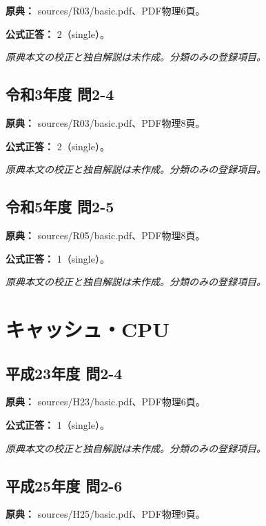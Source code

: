 \noindent\textbf{原典：} sources/R03/basic.pdf、PDF物理6頁。

\textbf{公式正答：} 2（single）。

\par\textit{原典本文の校正と独自解説は未作成。分類のみの登録項目。}

\subsection{令和3年度 問2-4}
\label{q:r03-reg-basic-2-4}

\noindent\textbf{原典：} sources/R03/basic.pdf、PDF物理8頁。

\textbf{公式正答：} 2（single）。

\par\textit{原典本文の校正と独自解説は未作成。分類のみの登録項目。}

\subsection{令和5年度 問2-5}
\label{q:r05-reg-basic-2-5}

\noindent\textbf{原典：} sources/R05/basic.pdf、PDF物理8頁。

\textbf{公式正答：} 1（single）。

\par\textit{原典本文の校正と独自解説は未作成。分類のみの登録項目。}

\section{キャッシュ・CPU}

\subsection{平成23年度 問2-4}
\label{q:h23-reg-basic-2-4}

\noindent\textbf{原典：} sources/H23/basic.pdf、PDF物理6頁。

\textbf{公式正答：} 1（single）。

\par\textit{原典本文の校正と独自解説は未作成。分類のみの登録項目。}

\subsection{平成25年度 問2-6}
\label{q:h25-reg-basic-2-6}

\noindent\textbf{原典：} sources/H25/basic.pdf、PDF物理9頁。

